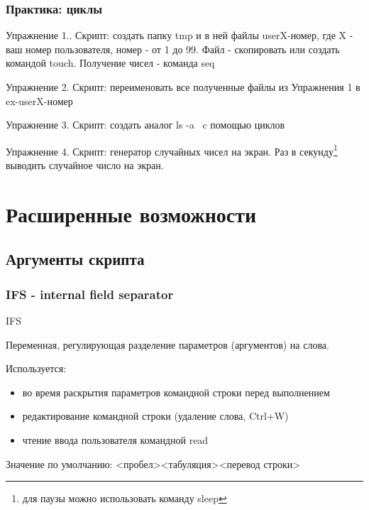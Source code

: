 \begin{frame}
  \frametitle{Практика: циклы}

    \alert{Упражнение 1.}. Скрипт: создать папку tmp и в ней файлы userX-номер, где X - ваш номер пользователя, номер - от 1 до 99. Файл - скопировать или создать командой touch. Получение чисел - команда seq \pause

    \alert{Упражнение 2.} Скрипт: переименовать все полученные файлы из Упражнения 1 в \textqutedbl ex-userX-номер \textqutedbl \pause

    \alert{Упражнение 3.} Скрипт: создать аналог \textqutedbl ls -a \textqutedbl\ c помощью циклов \pause

    \alert{Упражнение 4.} Скрипт: генератор случайных чисел на экран. Раз в секунду\footnote{для паузы можно использовать команду sleep} выводить случайное число на экран.
\end{frame}

\section{Расширенные возможности}

\subsection{Аргументы скрипта}
\begin{frame}[fragile]
  \frametitle{IFS - internal field separator}

  \alert{IFS}

  Переменная, регулирующая разделение параметров (аргументов) на слова. 
  
  Используется:
  \begin{itemize}
    \item во время раскрытия параметров командной строки перед выполнением
    \item редактирование командной строки (удаление слова, Ctrl+W)
    \item чтение ввода пользователя командной \alert{read}
  \end{itemize}

  Значение по умолчанию: \textqutedbl <пробел><табуляция><перевод строки> \textqutedbl


\end{frame}

